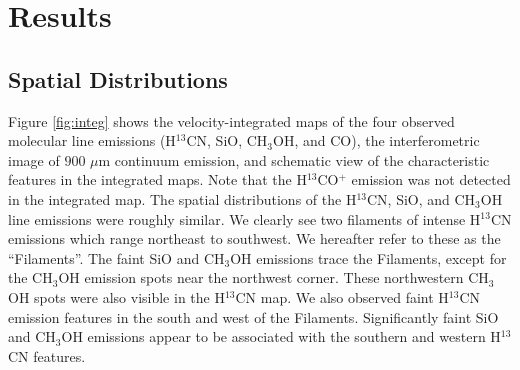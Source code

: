 \documentclass[twocolumn]{aastex631}
\newcommand\kms{\hbox{km$\,$s$^{-1}$}}
\begin{document}
\begin{figure*}[hbtp]
\centering
{}
\caption{(a--d) Integrated intensity maps of the H$^{13}$CN, SiO, CH$_3$OH, and CO lines over $V_{\rm LSR}$ = $-50$ to $+250$ \kms. The velocity range is set to avoid contamination of emissions from other spectral lines. The synthesized beam is shown as a white ellipse at the bottom left of each panel. The maps are produced by combining the interferometric (12 m and 7 m) images with the TP images. (e) The interferometric image of $900$ {\rm $\mu$m} continuum emission. The contour levels are 1, 2, 3, 4, and $5$ {\rm mJy beam$^{-1}$}. The standard deviation is $1.6$ {\rm mJy beam$^{-1}$}.  The red cross indicates the position of the brightest continuum core. (f) The schematic view of the characteristic features. Colors represent spectral lines in which each feature is prominent; blue: H$^{13}$CN, green: CH$_3$OH, and red: CO. The Filaments are more elongated toward the southwest than in the integration map, taking into account the velocity channel map in Figure \ref{fig:h13cn}. 
\label{fig:integ}}
\end{figure*}

\section{Results}
\subsection{Spatial Distributions}
Figure \ref{fig:integ} shows the velocity-integrated maps of the four observed molecular line emissions (H$^{13}$CN, SiO, CH$_3$OH, and CO), the interferometric image of $900$ {\rm $\mu$m} continuum emission, and schematic view of the characteristic features in the integrated maps. Note that the H$^{13}$CO$^{+}$ emission was not detected in the integrated map. The spatial distributions of the H$^{13}$CN, SiO, and CH$_3$OH line emissions were roughly similar. We clearly see two filaments of intense H$^{13}$CN emissions which range northeast to southwest.  We hereafter refer to these as the ``Filaments''. The faint SiO and CH$_3$OH emissions trace the Filaments, except for the CH$_3$OH emission spots near the northwest corner. These northwestern CH$_3$OH spots were also visible in the H$^{13}$CN map. We also observed faint H$^{13}$CN emission features in the south and west of the Filaments. Significantly faint SiO and CH$_3$OH emissions appear to be associated with the southern and western H$^{13}$CN features.
\end{document}
